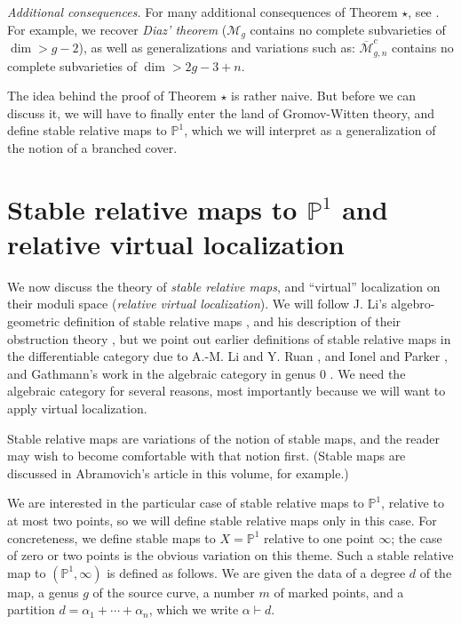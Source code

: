 \documentclass[12pt,letterpaper]{amsart}
\newcommand{\epoint}[1]{\vspace{3mm}\par \noindent \refstepcounter{subsection}{\bf \thesubsection.} 
  {\em #1.} }
\newcommand{\proj}{\mathbb P}
\newcommand{\cm}{{\mathcal{M}}}
\newcommand{\cmbar}{\overline{\cm}}
\newcommand{\al}{\alpha}
\newcommand{\lremind}[1]{{\bf[label:  #1]}}
\renewcommand{\lremind}[1]{{}}
\begin{document}
{\epoint{Additional consequences} For many additional consequences of
Theorem $\star$, see \cite{thmstar}.  For example, we recover {\em
  Diaz' theorem} ($\cm_g$ contains no complete subvarieties of $\dim >
g-2$), as well as generalizations and variations such as:
$\cmbar_{g,n}^{c}$ contains no complete subvarieties of $\dim >
2g-3+n$.

The idea behind the proof of Theorem $\star$ is rather naive.
But before we can discuss it, we will have to finally enter
the land of Gromov-Witten theory, and define stable relative maps
to $\proj^1$, which we will interpret as a generalization of the notion of 
a branched cover.

\section{Stable relative maps to $\proj^1$ and relative virtual localization}

We\label{s:rvl}\lremind{s:rvl}
 now discuss the theory of {\em stable relative maps}, and
``virtual'' localization on their moduli space ({\em relative virtual
  localization}).  We will follow J. Li's algebro-geometric definition
of stable relative maps \cite{li1}, and his description of their
obstruction theory \cite{li2}, but we point out earlier definitions of
stable relative maps in the differentiable category due to A.-M. Li
and Y. Ruan \cite{lr}, and Ionel and Parker \cite{ip1, ip2}, and
Gathmann's work in the algebraic category in genus 0 \cite{gathmann}.
We need the algebraic category for several reasons, most importantly
because we will want to apply virtual localization.

Stable relative maps are variations of the notion of stable maps, and
the reader may wish to become comfortable with that notion first.
(Stable maps are discussed in Abramovich's article in this volume, for
example.)

We are interested in the particular case of stable relative maps to
$\proj^1$, relative to at most two points, so we will define stable relative
maps only in this case.   
For concreteness, we define stable maps to $X=\proj^1$ relative to
one point $\infty$; the case of zero or two points is the obvious
variation on this theme.  Such a stable relative map to $(\proj^1,
\infty)$ is defined as follows.  We are given the data of a degree $d$
of the map, a genus $g$ of the source curve, a number $m$ of marked
points, and a partition $d = \al_1 + \cdots + \al_n$, which we write
$\al \vdash d$.

}
\end{document}
